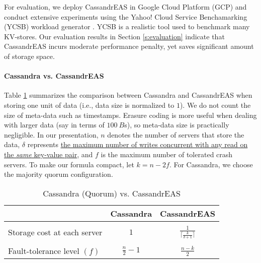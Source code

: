 For evaluation, we deploy CassandrEAS in Google Cloud Platform (GCP) and conduct extensive experiments using the Yahoo! Cloud Service Benchamarking (YCSB) workload generator \cite{YCSB:2010}. YCSB is a realistic tool used to benchmark many KV-stores.
Our evaluation results in Section \ref{s:evaluation} indicate that CassandrEAS incurs moderate performance penalty, yet saves significant amount of storage space.

\paragraph*{Cassandra vs. CassandrEAS}
Table \ref{t:comparison} summarizes the comparison between Cassandra and CassandrEAS when storing one unit of data (i.e., data size is normalized to $1$). We do not count the size of meta-data such as timestamps. Erasure coding is more useful when dealing with larger data (say in terms of $100~B$s), so meta-data size is practically negligible. 
In our presentation, $n$ denotes the number of servers that store the data, $\delta$ represents \underline{the maximum number of writes concurrent with any read on} \underline{the \textit{same} key-value pair}, and $f$ is the maximum number of tolerated crash servers.
To make our formula compact, let $k = n-2f$. For Cassandra, we choose the majority quorum configuration.

\begin{table}[h]
	\centering
	\begin{tabular}{ l|c|c}
		& Cassandra &  CassandrEAS  \\ \hline
		&&\\[-0.8em]
		Storage cost at each server & $1$ &  $\frac{1}{ \lceil\frac{k}{\delta+1}\rceil}$  \\
		&&\\[-0.8em]\hline
		Fault-tolerance level $(f)$& $\frac{n}{2} - 1$     &  $\frac{n-k}{2}$  \\%
	\end{tabular}
	\caption{Cassandra (Quorum) vs. CassandrEAS}
	\label{t:comparison}
\end{table}

